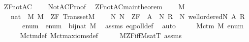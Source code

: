 %
\begin{isabellebody}%
%
%
\isadelimtheory
%
\endisadelimtheory
%
\isatagtheory
{}\isamarkupfalse%
\ ZF{\isacharunderscore}{\kern0pt}notAC\ \isanewline
\ \ \ NotAC{\isacharunderscore}{\kern0pt}Proof\ \isanewline
{}%
\endisatagtheory
{\isafoldtheory}%
%
\isadelimtheory
\isanewline
%
\endisadelimtheory
\isanewline
\isanewline
{}\isamarkupfalse%
\ ZF{\isacharunderscore}{\kern0pt}notAC{\isacharunderscore}{\kern0pt}main{\isacharunderscore}{\kern0pt}theorem\ {\isacharcolon}{\kern0pt}\isanewline
\ \ \ M\ \isanewline
\ \ \ {\isachardoublequoteopen}nat\ {\isasymapprox}\ M{\isachardoublequoteclose}\ {\isachardoublequoteopen}M\ {\isasymTurnstile}\ ZF{\isachardoublequoteclose}\ {\isachardoublequoteopen}Transset{\isacharparenleft}{\kern0pt}M{\isacharparenright}{\kern0pt}{\isachardoublequoteclose}\ \isanewline
\ \ \ {\isachardoublequoteopen}{\isasymexists}N{\isachardot}{\kern0pt}\ N\ {\isasymTurnstile}\ ZF\ {\isasymand}\ {\isasymnot}{\isacharparenleft}{\kern0pt}{\isasymforall}A\ {\isasymin}\ N{\isachardot}{\kern0pt}\ {\isasymexists}R\ {\isasymin}\ N{\isachardot}{\kern0pt}\ wellordered{\isacharparenleft}{\kern0pt}{\isacharhash}{\kern0pt}{\isacharhash}{\kern0pt}N{\isacharcomma}{\kern0pt}\ A{\isacharcomma}{\kern0pt}\ R{\isacharparenright}{\kern0pt}{\isacharparenright}{\kern0pt}{\isachardoublequoteclose}\ \isanewline
%
\isadelimproof
%
\endisadelimproof
%
\isatagproof
{}\isamarkupfalse%
\ {\isacharminus}{\kern0pt}\ \isanewline
\isanewline
\ \ \isamarkupfalse%
\ enum\ \ {\isachardoublequoteopen}enum\ {\isasymin}\ bij{\isacharparenleft}{\kern0pt}nat{\isacharcomma}{\kern0pt}\ M{\isacharparenright}{\kern0pt}{\isachardoublequoteclose}\ \isamarkupfalse%
\ assms\ eqpoll{\isacharunderscore}{\kern0pt}def\ \isamarkupfalse%
\ auto\isanewline
\ \ \isamarkupfalse%
\ \isamarkupfalse%
\ M{\isacharunderscore}{\kern0pt}ctm\ M\ enum\ \isanewline
\ \ \ \ \isamarkupfalse%
\ M{\isacharunderscore}{\kern0pt}ctm{\isacharunderscore}{\kern0pt}def\ M{\isacharunderscore}{\kern0pt}ctm{\isacharunderscore}{\kern0pt}axioms{\isacharunderscore}{\kern0pt}def\isanewline
\ \ \ \ \isamarkupfalse%
\ M{\isacharunderscore}{\kern0pt}ZF{\isacharunderscore}{\kern0pt}iff{\isacharunderscore}{\kern0pt}M{\isacharunderscore}{\kern0pt}satT\ assms\ \isanewline

\end{isabellebody}
